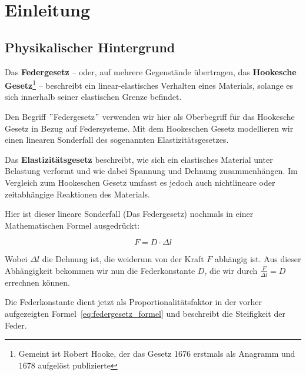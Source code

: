 \documentclass[../main.tex]{subfiles} %
\begin{document}
\chapter{Einleitung}\label{ch:einleitung}

\section{Physikalischer Hintergrund}\label{sec:physikalischer-hintergrund}

Das \textbf{Federgesetz} – oder, auf mehrere Gegenstände übertragen, das \textbf{Hookesche Gesetz}\footnote{Gemeint ist Robert Hooke, der das Gesetz 1676 erstmals als Anagramm und 1678 aufgelöst publizierte} – beschreibt ein linear-elastisches Verhalten eines Materials, solange es sich innerhalb seiner elastischen Grenze befindet.

Den Begriff \("\)Federgesetz\("\) verwenden wir hier als Oberbegriff für das Hookesche Gesetz in Bezug auf Federsysteme.
Mit dem Hookeschen Gesetz modellieren wir einen linearen Sonderfall des sogenannten Elastizitätsgesetzes.
\begin{tcolorbox}[
        title=Ausholung für das Elastizitätsgesetz,
        colback=gray!10,
        colframe=gray!50,
        boxrule=0.5pt,
        arc=2mm,
        left=2mm,
        right=2mm,
        top=1mm,
        bottom=1mm,
        fonttitle=\bfseries,
    ]
    Das \textbf{Elastizitätsgesetz} beschreibt, wie sich ein elastisches Material unter Belastung verformt und wie dabei Spannung und Dehnung zusammenhängen.
    Im Vergleich zum Hookeschen Gesetz umfasst es jedoch auch nichtlineare oder zeitabhängige Reaktionen des Materials.
\end{tcolorbox}

Hier ist dieser lineare Sonderfall (Das Federgesetz) nochmals in einer Mathematischen Formel ausgedrückt:

\begin{equation}
    F = D \cdot \Delta l
    \label{eq:federgesetz_formel}
\end{equation}

Wobei ${\Delta l}$ die Dehnung ist, die weiderum von der Kraft ${F}$ abhängig ist.
Aus dieser Abhängigkeit bekommen wir nun die Federkonstante ${D}$, die wir durch ${\frac{F}{\Delta l} = D}$ errechnen können.

Die Federkonstante dient jetzt als Proportionalitätsfaktor in der vorher aufgezeigten Formel~\ref{eq:federgesetz_formel} und beschreibt die Steifigkeit der Feder.
\end{document}
